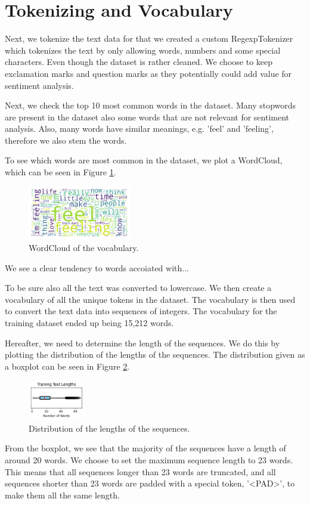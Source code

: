 \section{Tokenizing and Vocabulary}
Next, we tokenize the text data for that we created a custom RegexpTokenizer which tokenizes the text by only allowing words, numbers and some special characters. Even though the dataset is rather cleaned. We choose to keep exclamation marks and question marks as they potentially could add value for sentiment analysis.

Next, we check the top 10 most common words in the dataset. Many stopwords are present in the dataset also some words that are not relevant for sentiment analysis. Also, many words have similar meanings, e.g. 'feel' and 'feeling', therefore we also stem the words.

To see which words are most common in the dataset, we plot a WordCloud, which can be seen in Figure \ref{fig:wordcloud}.
\begin{figure}[H]
    \vspace*{0.7cm}
    \centering
    \includegraphics[width=0.4\textwidth]{figures/wordcloud.png}
    \caption{WordCloud of the vocabulary.}
    \label{fig:wordcloud}
    \vspace*{0.7cm}
\end{figure}
We see a clear tendency to words accoiated with...

To be sure also all the text was converted to lowercase. We then create a vocabulary of all the unique tokens in the dataset. The vocabulary is then used to convert the text data into sequences of integers. The vocabulary for the training dataset ended up being 15,212 words.

Hereafter, we need to determine the length of the sequences. We do this by plotting the distribution of the lengths of the sequences. The distribution given as a boxplot can be seen in Figure \ref{fig:sequence_length}.
\begin{figure}[H]
    \vspace*{0.7cm}
    \centering
    \includegraphics[width=0.22\textwidth]{figures/sentence_length.png}
    \caption{Distribution of the lengths of the sequences.}
    \label{fig:sequence_length}
    \vspace*{0.7cm}
\end{figure}
From the boxplot, we see that the majority of the sequences have a length of around 20 words. We choose to set the maximum sequence length to 23 words. This means that all sequences longer than 23 words are truncated, and all sequences shorter than 23 words are padded with a special token, '<PAD>', to make them all the same length.

